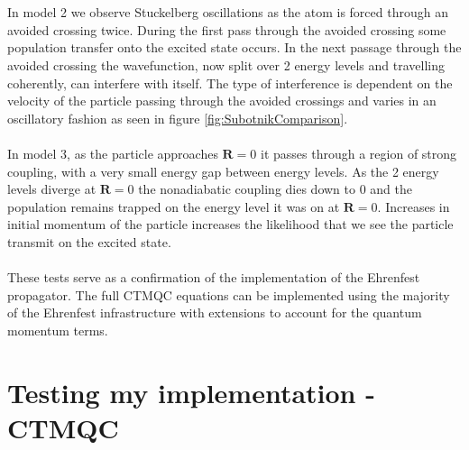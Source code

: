 \\\\
In model 2 we observe St\:uckelberg oscillations as the atom is forced through an avoided crossing twice. During the first pass through the avoided crossing some population transfer onto the excited state occurs. In the next passage through the avoided crossing the wavefunction, now split over 2 energy levels and travelling coherently, can interfere with itself. The type of interference is dependent on the velocity of the particle passing through the avoided crossings and varies in an oscillatory fashion as seen in figure \ref{fig:SubotnikComparison}.
\\\\
In model 3, as the particle approaches $\mathbf{R}=0$ it passes through a region of strong coupling, with a very small energy gap between energy levels. As the 2 energy levels diverge at $\mathbf{R}=0$ the nonadiabatic coupling dies down to 0 and the population remains trapped on the energy level it was on at $\mathbf{R}=0$. Increases in initial momentum of the particle increases the likelihood that we see the particle transmit on the excited state.
\\\\
These tests serve as a confirmation of the implementation of the Ehrenfest propagator. The full CTMQC equations can be implemented using the majority of the Ehrenfest infrastructure with extensions to account for the quantum momentum terms.

\section{Testing my implementation -CTMQC}
